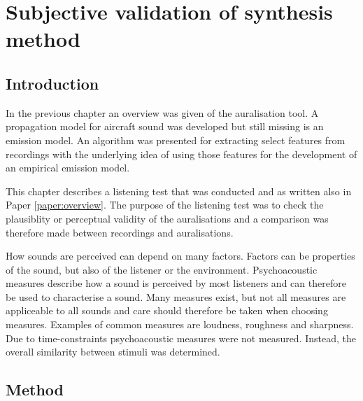 \chapter{Subjective validation of synthesis method}\label{chapter:test}

\section{Introduction}
In the previous chapter an overview was given of the auralisation tool. A
propagation model for aircraft sound was developed but still missing is an
emission model. An algorithm was presented for extracting select features from
recordings with the underlying idea of using those features for the development
of an empirical emission model.

This chapter describes a listening test that was conducted and as written also in
Paper \ref{paper:overview}. The purpose of the listening test was to check the
plausiblity or perceptual validity of the auralisations and a comparison was
therefore made between recordings and auralisations.

How sounds are perceived can depend on many factors. Factors can be properties
of the sound, but also of the listener or the environment. Psychoacoustic
measures describe how a sound is perceived by most listeners and can therefore
be used to characterise a sound. Many measures exist, but not all measures are
appliceable to all sounds and care should therefore be taken when choosing
measures. Examples of common measures are loudness, roughness and sharpness.
Due to time-constraints psychoacoustic measures were not measured. Instead, the
overall similarity between stimuli was determined.

%



\section{Method} %

